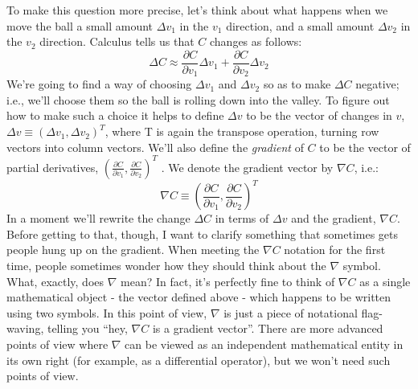 To make this question more precise, let's think about what happens when we move the ball a small amount $\Delta v_1$ in the $v_1$ direction, and a small amount $\Delta v_2$ in the $v_2$ direction. Calculus tells us that $C$ changes as follows: 
\begin{equation}
\Delta C \approx \frac{\partial C}{\partial v_{1}} \Delta v_{1}+\frac{\partial C}{\partial v_{2}} \Delta v_{2}
\label{eq:c01-07-deltaC01}
\end{equation}
We're going to find a way of choosing $\Delta v_1$ and $\Delta v_2$ so as to make $\Delta C$ negative; i.e., we'll choose them so the ball is rolling down into the valley. To figure out how to make such a choice it helps to define $\Delta v$ to be the vector of changes in $v$, $\Delta v \equiv\left(\Delta v_{1}, \Delta v_{2}\right)^{T}$, where T is again the transpose operation, turning row vectors into column vectors. We'll also define the \textit{gradient} of $C$ to be the vector of partial derivatives, $\left(\frac{\partial C}{\partial v_{1}}, \frac{\partial C}{\partial v_{2}}\right)^{T}$ . We denote the gradient vector by $\nabla C$, i.e.: 
\begin{equation}
\nabla C \equiv\left(\frac{\partial C}{\partial v_{1}}, \frac{\partial C}{\partial v_{2}}\right)^{T}
\end{equation}
In a moment we'll rewrite the change $\Delta C$ in terms of $\Delta v$ and the gradient, $\nabla C$. Before getting to that, though, I want to clarify something that sometimes gets people hung up on the gradient. When meeting the $\nabla C$ notation for the first time, people sometimes wonder how they should think about the $\nabla$ symbol. What, exactly, does $\nabla$ mean? In fact, it's perfectly fine to think of $\nabla C$ as a single mathematical object - the vector defined above - which happens to be written using two symbols. In this point of view, $\nabla $ is just a piece of notational flag-waving, telling you ``hey, $\nabla C$ is a gradient vector''. There are more advanced points of view where $\nabla $ can be viewed as an independent mathematical entity in its own right (for example, as a differential operator), but we won't need such points of view.

